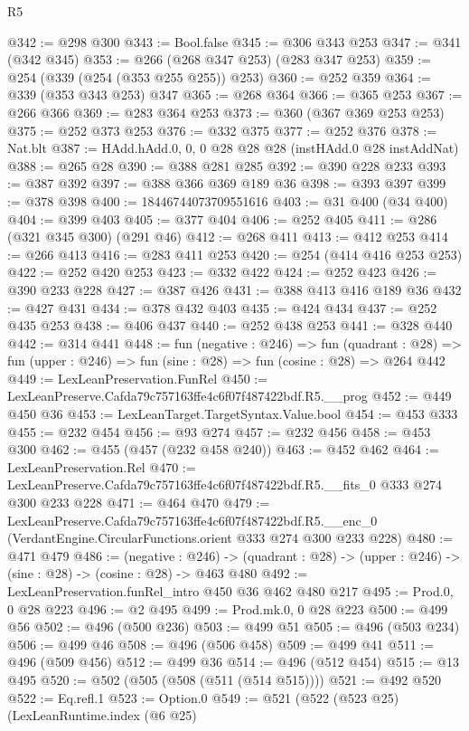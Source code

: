 \begin{lexlean}{R5}
\begin{coremodule}
@342 := @298 @300
@343 := Bool.false
@345 := @306 @343 @253
@347 := @341 (@342 @345)
@353 := @266 (@268 @347 @253) (@283 @347 @253)
@359 := @254 (@339 (@254 (@353 @255 @255)) @253)
@360 := @252 @359
@364 := @339 (@353 @343 @253) @347
@365 := @268 @364
@366 := @365 @253
@367 := @266 @366
@369 := @283 @364 @253
@373 := @360 (@367 @369 @253 @253)
@375 := @252 @373 @253
@376 := @332 @375
@377 := @252 @376
@378 := Nat.blt
@387 := HAdd.hAdd.{0, 0, 0} @28 @28 @28 (instHAdd.{0} @28 instAddNat)
@388 := @265 @28
@390 := @388 @281 @285
@392 := @390 @228 @233
@393 := @387 @392
@397 := @388 @366 @369 @189 @36
@398 := @393 @397
@399 := @378 @398
@400 := 18446744073709551616
@403 := @31 @400 (@34 @400)
@404 := @399 @403
@405 := @377 @404
@406 := @252 @405
@411 := @286 (@321 @345 @300) (@291 @46)
@412 := @268 @411
@413 := @412 @253
@414 := @266 @413
@416 := @283 @411 @253
@420 := @254 (@414 @416 @253 @253)
@422 := @252 @420 @253
@423 := @332 @422
@424 := @252 @423
@426 := @390 @233 @228
@427 := @387 @426
@431 := @388 @413 @416 @189 @36
@432 := @427 @431
@434 := @378 @432 @403
@435 := @424 @434
@437 := @252 @435 @253
@438 := @406 @437
@440 := @252 @438 @253
@441 := @328 @440
@442 := @314 @441
@448 := fun (negative : @246) =>
  fun (quadrant : @28) => fun (upper : @246) => fun (sine : @28) => fun (cosine : @28) => @264 @442
@449 := LexLeanPreservation.FunRel
@450 := LexLeanPreserve.Cafda79c757163ffe4c6f07f487422bdf.R5.__prog
@452 := @449 @450 @36
@453 := LexLeanTarget.TargetSyntax.Value.bool
@454 := @453 @333
@455 := @232 @454
@456 := @93 @274
@457 := @232 @456
@458 := @453 @300
@462 := @455 (@457 (@232 @458 @240))
@463 := @452 @462
@464 := LexLeanPreservation.Rel
@470 := LexLeanPreserve.Cafda79c757163ffe4c6f07f487422bdf.R5.__fits_0 @333 @274 @300 @233 @228
@471 := @464 @470
@479 := LexLeanPreserve.Cafda79c757163ffe4c6f07f487422bdf.R5.__enc_0
    (VerdantEngine.CircularFunctions.orient @333 @274 @300 @233 @228)
@480 := @471 @479
@486 := (negative : @246) ->
  (quadrant : @28) -> (upper : @246) -> (sine : @28) -> (cosine : @28) -> @463 @480
@492 := LexLeanPreservation.funRel_intro @450 @36 @462 @480 @217
@495 := Prod.{0, 0} @28 @223
@496 := @2 @495
@499 := Prod.mk.{0, 0} @28 @223
@500 := @499 @56
@502 := @496 (@500 @236)
@503 := @499 @51
@505 := @496 (@503 @234)
@506 := @499 @46
@508 := @496 (@506 @458)
@509 := @499 @41
@511 := @496 (@509 @456)
@512 := @499 @36
@514 := @496 (@512 @454)
@515 := @13 @495
@520 := @502 (@505 (@508 (@511 (@514 @515))))
@521 := @492 @520
@522 := Eq.refl.{1}
@523 := Option.{0}
@549 := @521
    (@522
      (@523 @25)
      (LexLeanRuntime.index
        (@6 @25)

\end{coremodule}
\end{lexlean}
